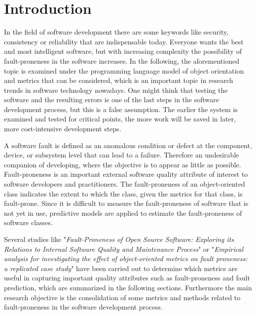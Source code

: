 \section{Introduction}

In the field of software development there are some keywords like security, consistency or reliability that are indispensable today. Everyone wants the best and most intelligent software, but with increasing complexity the possibility of fault-proneness in the software increases. In the following, the aforementioned topic is examined under the programming language model of object orientation and metrics that can be considered, which is an important topic in research trends in software technology nowadays.
One might think that testing the software and the resulting errors is one of the last steps in the software development process, but this is a false assumption. The earlier the system is examined and tested for critical points, the more work will be saved in later, more cost-intensive development steps.

A software fault is defined as an anomalous condition or defect at the component, device, or subsystem level that can lead to a failure. Therefore an undesirable companion of developing, where the objective is to appear as little as possible.
Fault-proneness is an important external software quality attribute of interest to software developers and practitioners. The fault-proneness of an object-oriented class indicates the extent to which the class, given the metrics for that class, is fault-prone. Since it is difficult to measure the fault-proneness of software that is not yet in use, predictive models are applied to estimate the fault-proneness of software classes.

Several studies like "\textit{Fault-Proneness of Open Source Software: Exploring its Relations to Internal Software Quality and Maintenance Process}" \cite{kozlov2013fault} or "\textit{Empirical analysis for investigating the effect of object-oriented metrics on fault proneness: a replicated case study}" \cite{b2aggarwal2009empirical} have been carried out to determine which metrics are useful in capturing important quality attributes such as fault-proneness  and fault prediction, which are summarized in the following sections.
Furthermore the main research objective is the consolidation of some metrics and methods related to fault-proneness in the software development process.

